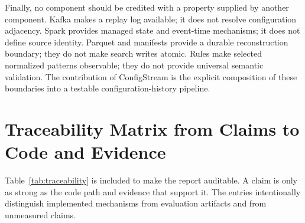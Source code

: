 Finally, no component should be credited with a property supplied by another component. Kafka makes a replay log available; it does not resolve configuration adjacency. Spark provides managed state and event-time mechanisms; it does not define source identity. Parquet and manifests provide a durable reconstruction boundary; they do not make search writes atomic. Rules make selected normalized patterns observable; they do not provide universal semantic validation. The contribution of ConfigStream is the explicit composition of these boundaries into a testable configuration-history pipeline.

\section{Traceability Matrix from Claims to Code and Evidence}
\label{app:traceability}

Table~\ref{tab:traceability} is included to make the report auditable. A claim is only as strong as the code path and evidence that support it. The entries intentionally distinguish implemented mechanisms from evaluation artifacts and from unmeasured claims.

